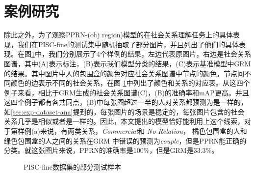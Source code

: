 \section{案例研究}

除此之外，为了观察PPRN-(obj region)模型的在社会关系理解任务上的具体表现，我们在PISC-fine的测试集中随机抽取了部分图片，并且列出了他们的具体表现。在图\ref{fig:exp-case-study}中，我们分别展示了4个样例的结果，左边代表原图片，右边是社会关系图谱，其中(A)表示标注，(B)表示我们模型分类的结果，(C)表示基准模型中GRM的结果。其中图片中人的包围盒的颜色对应社会关系图谱中节点的颜色，节点间不同颜色的边表示不同的社会关系，在图
\ref{fig:exp-case-study}中列出了颜色和关系的对应表。从这四个例子来看，相比于GRM生成的社会关系图谱(C)，(B)的准确率和mAP更高。并且这四个例子都有各共同点，(B)中每张图超过一半的人对关系都预测为是一样的，如\ref{sec:exp-dataset-ana}提到的，每张图片的场景是稳定的，每张图片包含的社会关系几乎是相似或者是一样的。因此，本文提出的模型恰好能利用上这个线索，对于第样例(a)来说，有两类关系，{\it Commercial}和
{\it No Relation}， 橘色包围盒的人和绿色包围盒的人之间的关系在GRM 中错误的预测为{\it couple}，但是PPRN能正确的分类。就这张图片来说，PPRN的准确率是100\%，但是GRM是33.3\%。
\begin{figure}[htpb]
	\centering
    \caption{PISC-fine数据集的部分测试样本}
    \label{fig:exp-case-study}
\end{figure}

